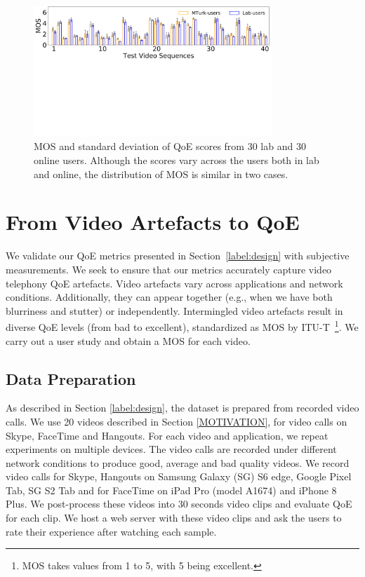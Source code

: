 \begin{figure}[t]
  \centering
  \includegraphics[width=0.8\textwidth]{sections/network-work/mos}
  \vspace{-2in}
  \caption{MOS and standard deviation of QoE scores from 30 lab and 30 online users. Although the scores vary across the users both in lab and online, the distribution of MOS is similar in two cases.}
  \vspace{-0.15in}
  \label{fig:mos}
\end{figure}

\section{From Video Artefacts to Q\lowercase{o}E} \label{label:results}
We validate our QoE metrics presented in Section~\ref{label:design} with subjective measurements. We seek to ensure that our metrics accurately capture  video telephony QoE artefacts. Video artefacts vary across applications and network conditions. Additionally, they can appear together (e.g., when we have both blurriness and stutter) or independently. Intermingled video artefacts result in diverse QoE levels (from bad to excellent), standardized as MOS by ITU-T~\cite{series2012methodology}\footnote{MOS takes values from 1 to 5, with 5 being excellent.}. We carry out a user study and obtain a MOS for each video.

\subsection{Data Preparation}
As described in Section \ref{label:design}, the dataset is prepared from recorded video calls. We use 20 videos described in Section \ref{MOTIVATION}, for video calls on Skype, FaceTime and Hangouts. For each video and application, we repeat  experiments on  multiple devices. The video calls are recorded under different network conditions to produce good, average and bad quality videos. We record video calls for Skype, Hangouts on Samsung Galaxy (SG) S6 edge, Google Pixel Tab, SG S2 Tab and for FaceTime on iPad Pro (model A1674) and iPhone 8 Plus. We post-process these videos into 30 seconds  video clips and evaluate QoE for each clip. We host a web server with these video clips and ask the users to rate their experience after watching each sample. 

